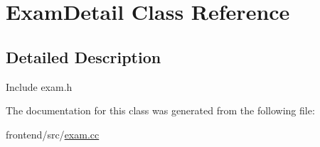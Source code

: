 \hypertarget{classExamDetail}{\section{Exam\-Detail Class Reference}
\label{classExamDetail}
}


\subsection{Detailed Description}
Include exam.\-h 

The documentation for this class was generated from the following file\-:\begin{DoxyCompactItemize}
\item 
frontend/src/\hyperlink{exam_8cc}{exam.\-cc}\end{DoxyCompactItemize}
